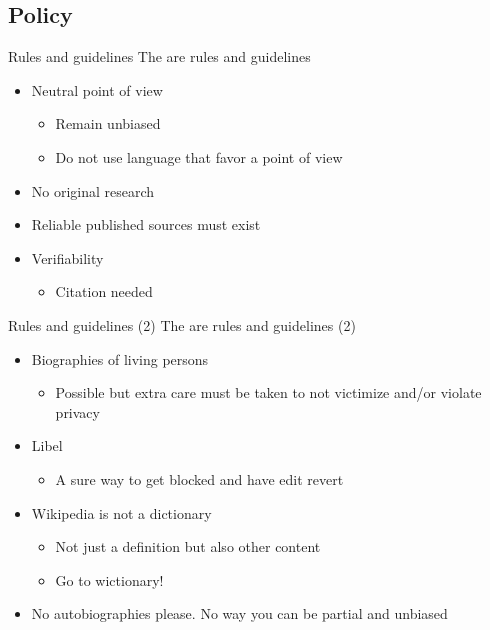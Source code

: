 \documentclass{beamer}
\begin{document}
\subsection{Policy}
\begin{frame}{Rules and guidelines}
	The are rules and guidelines
	\begin{itemize}
		\pause \item Neutral point of view
			\begin{itemize}
				\pause \item Remain unbiased
				\pause \item Do not use language that favor a point of view
			\end{itemize}
		\pause \item No original research
		\pause \item Reliable published sources must exist
		\pause \item Verifiability
			\begin{itemize}
				\pause \item Citation needed
			\end{itemize}
	\end{itemize}
\end{frame}
\begin{frame}{Rules and guidelines (2)}
	The are rules and guidelines (2)
	\begin{itemize}
		\pause \item Biographies of living persons
			\begin{itemize}
				\pause \item Possible but extra care must be taken to not victimize and/or violate privacy
			\end{itemize}
		\pause \item Libel
			\begin{itemize}
				\pause \item A sure way to get blocked and have edit revert
			\end{itemize}
		\pause \item Wikipedia is not a dictionary
			\begin{itemize}
				\pause \item Not just a definition but also other content
				\pause \item Go to wictionary!
			\end{itemize}
		\pause \item No autobiographies please. No way you can be partial and unbiased
	\end{itemize}
\end{frame}
\end{document}
